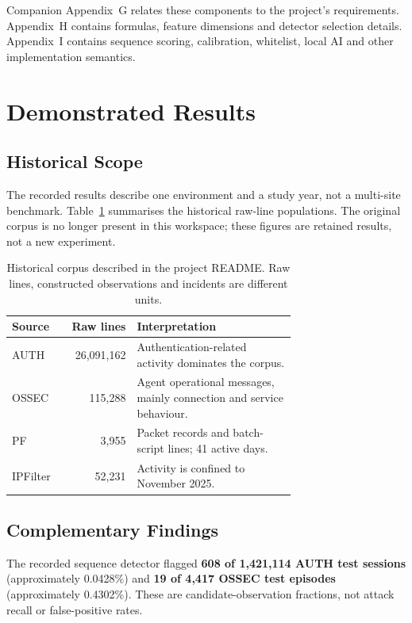 \documentclass[11pt,a4paper]{article}
\begin{document}
Companion Appendix~G relates these components to the project's requirements. Appendix~H contains formulas, feature dimensions and detector selection details. Appendix~I contains sequence scoring, calibration, whitelist, local AI and other implementation semantics.

\clearpage
\section{Demonstrated Results}

\subsection{Historical Scope}

The recorded results describe one environment and a study year, not a multi-site benchmark. Table~\ref{tab:core-corpus} summarises the historical raw-line populations. The original corpus is no longer present in this workspace; these figures are retained results, not a new experiment.

\begin{table}[H]
\centering\small
\begin{tabular}{p{0.15\linewidth}r p{0.56\linewidth}}
\toprule
\textbf{Source} & \textbf{Raw lines} & \textbf{Interpretation} \\
\midrule
AUTH & 26,091,162 & Authentication-related activity dominates the corpus. \\
OSSEC & 115,288 & Agent operational messages, mainly connection and service behaviour. \\
PF & 3,955 & Packet records and batch-script lines; 41 active days. \\
IPFilter & 52,231 & Activity is confined to November 2025. \\
\bottomrule
\end{tabular}
\caption{Historical corpus described in the project README. Raw lines, constructed observations and incidents are different units.}
\label{tab:core-corpus}
\end{table}

\subsection{Complementary Findings}

The recorded sequence detector flagged \textbf{608 of 1,421,114 AUTH test sessions} (approximately 0.0428\%) and \textbf{19 of 4,417 OSSEC test episodes} (approximately 0.4302\%). These are candidate-observation fractions, not attack recall or false-positive rates.
\end{document}
